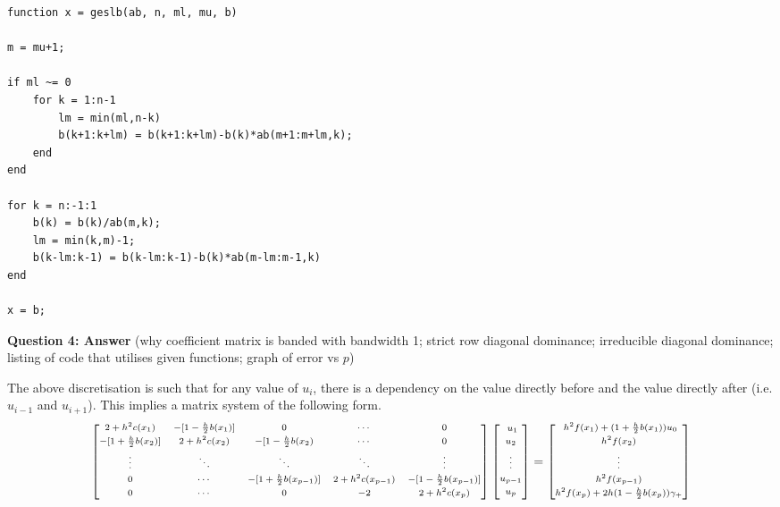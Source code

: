 \documentclass[12pt]{article}
\begin{document}
\begin{lstlisting}
function x = geslb(ab, n, ml, mu, b)

m = mu+1;

if ml ~= 0
    for k = 1:n-1
        lm = min(ml,n-k)
        b(k+1:k+lm) = b(k+1:k+lm)-b(k)*ab(m+1:m+lm,k);
    end
end

for k = n:-1:1
    b(k) = b(k)/ab(m,k);
    lm = min(k,m)-1;
    b(k-lm:k-1) = b(k-lm:k-1)-b(k)*ab(m-lm:m-1,k)
end

x = b;
\end{lstlisting}

\textbf{Question 4: Answer} (why coefficient matrix is banded with bandwidth 1; strict row diagonal dominance; irreducible diagonal dominance; listing of code that utilises given functions; graph of error vs $p$)

The above discretisation is such that for any value of $u_i$, there is a dependency on the value directly before and the value directly after (i.e. $u_{i-1}$ and $u_{i+1}$). This implies a matrix system of the following form.
\begin{equation*}
\scriptsize
	\begin{bmatrix}
       2 + h^2 c(x_1) & -[1-\frac{h}{2}b(x_1)] & 0 & \cdots  & 0   \\[0.3em]
       -[1+\frac{h}{2}b(x_2)] & 2 + h^2 c(x_2) & -[1-\frac{h}{2}b(x_2) &  \cdots & 0        \\[0.3em]
       \vdots & \ddots & \ddots & \ddots & \vdots	 \\[0.3em]
       0 & \cdots & -[1+\frac{h}{2}b(x_{p-1})] 	& 2 + h^2 c(x_{p-1}) & -[1-\frac{h}{2}b(x_{p-1})]  \\[0.3em]
       	0 & \cdots & 0 & -2 	& 2 + h^2 c(x_p)	  \\[0.3em]
	\end{bmatrix} 
	\begin{bmatrix}
       \ u_1 \\[0.3em]
       u_2\\[0.3em]
       \vdots\\[0.3em]
		u_{p-1}\\[0.3em]
		u_p\\[0.3em]
  \end{bmatrix} =
  \begin{bmatrix}
       \ h^2 f(x_1) + (1+\frac{h}{2}b(x_1))u_0 \\[0.3em]
       h^2 f(x_2)\\[0.3em]
       \vdots\\[0.3em]
		h^2 f(x_{p-1})\\[0.3em]
		h^2 f(x_p) + 2h(1-\frac{h}{2}b(x_p))\gamma_+\\[0.3em]
  \end{bmatrix}
\end{equation*}
\end{document}
